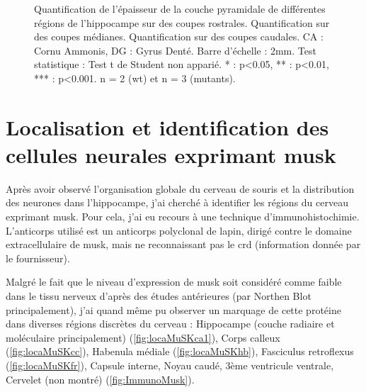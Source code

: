 \begin{figure}[h]
{					 Quantification de l'épaisseur de la couche pyramidale de différentes régions de l'hippocampe sur des coupes rostrales. 
					 Quantification sur des coupes médianes.
					 Quantification sur des coupes caudales.
					CA : Cornu Ammonis, DG : Gyrus Denté. 
					Barre d'échelle : 2mm. 
					Test statistique : Test t de Student non apparié. 
					* : p<0.05, ** : p<0.01, *** : p<0.001. 
					n = 2 (\acrshort{wt}) et n = 3 (mutants).
					}
			\label{fig:NeuNResultat}
		\end{figure}
	\FloatBarrier
	
\section{Localisation et identification des cellules neurales exprimant \acrshort{musk}}
	\label{ssec:musk}
	Après avoir observé l'organisation globale du cerveau de souris et la distribution des neurones dans l'hippocampe, j'ai cherché à identifier les régions du cerveau exprimant \gls{musk}. Pour cela, j'ai eu recours à une technique d'immunohistochimie. L'anticorps utilisé est un anticorps polyclonal de lapin, dirigé contre le domaine extracellulaire de \gls{musk}, mais ne reconnaissant pas le \gls{crd} (information donnée par le fournisseur).
	
	Malgré le fait que le niveau d'expression de \gls{musk} soit considéré comme faible dans le tissu nerveux d'après des études antérieures (par Northen Blot principalement), j'ai quand même pu observer un marquage de cette protéine dans diverses régions discrètes du cerveau : Hippocampe (couche radiaire et moléculaire principalement) (\cref{fig:locaMuSKca1}), Corps calleux (\cref{fig:locaMuSKcc}), Habenula médiale (\cref{fig:locaMuSKhb}), Fasciculus retroflexus (\cref{fig:locaMuSKfr}), Capsule interne, Noyau caudé, 3ème ventricule ventrale, Cervelet (non montré) (\cref{fig:ImmunoMusk}). 
	
